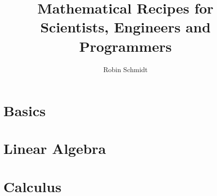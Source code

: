 \documentclass[12pt]{book}  %
\begin{document}
	
\parindent=0in
\parskip=0pt
		
 \setcounter{page}{1}

\author{Robin Schmidt}

\title{Mathematical Recipes for Scientists, Engineers and Programmers}
\maketitle
\tableofcontents

\chapter{Basics}
 
 



\chapter{Linear Algebra}
 


%

\chapter{Calculus}
 
 

 
%
%

\end{document}
